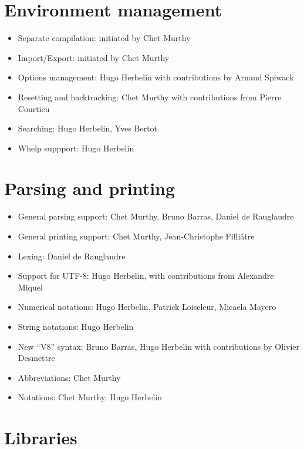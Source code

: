 \documentclass{article}
\begin{document}
\section{Environment management}

\begin{itemize}
\item Separate compilation: initiated by Chet Murthy
\item Import/Export: initiated by Chet Murthy
\item Options management: Hugo Herbelin with contributions by Arnaud Spiwack
\item Resetting and backtracking: Chet Murthy with contributions from Pierre Courtieu
\item Searching: Hugo Herbelin, Yves Bertot
\item Whelp suppport: Hugo Herbelin
\end{itemize}

\section{Parsing and printing}

\begin{itemize}
\item General parsing support: Chet Murthy, Bruno Barras, Daniel de Rauglaudre
\item General printing support: Chet Murthy, Jean-Christophe Filliâtre
\item Lexing: Daniel de Rauglaudre
\item Support for UTF-8: Hugo Herbelin, with contributions from Alexandre Miquel
\item Numerical notations: Hugo Herbelin, Patrick Loiseleur, Micaela Mayero
\item String notations: Hugo Herbelin
\item New ``V8'' syntax: Bruno Barras, Hugo Herbelin with contributions by Olivier Desmettre
\item Abbreviations: Chet Murthy
\item Notations: Chet Murthy, Hugo Herbelin
\end{itemize}

\section{Libraries}
\end{document}

